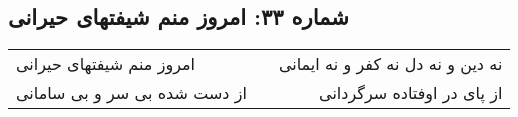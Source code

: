 \begin{center}
\section*{شماره ۳۳: امروز منم شیفتهای حیرانی}
\label{sec:033}
\begin{longtable}{l p{0.5cm} r}
امروز منم شیفتهای حیرانی
&&
نه دین و نه دل نه کفر و نه ایمانی
\\
از دست شده بی سر و بی سامانی
&&
از پای در اوفتاده سرگردانی
\\
\end{longtable}
\end{center}

